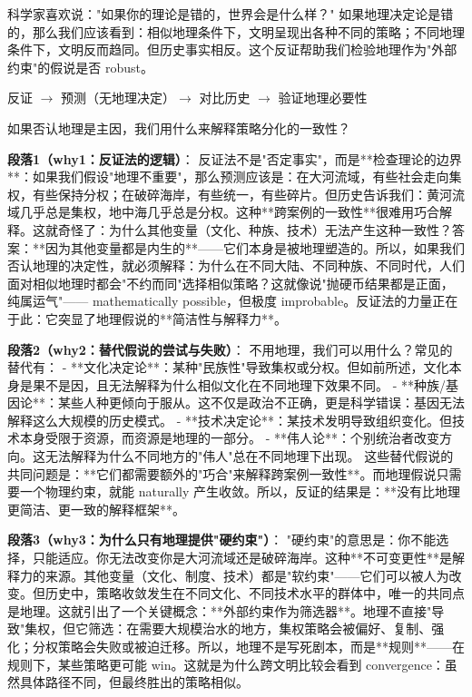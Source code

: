 \documentclass[openany, a4paper, 12pt]{book}
\newenvironment{logicmap}{
	\begin{tcolorbox}[
		colback=blue!5!white,      %
		colframe=blue!50!black,    %
		title=\textbf{逻辑地图 (Logic Map)}, %
		fonttitle=\bfseries,
		sharp corners=south,       %
		boxrule=0.5mm
		]
	\centering
	}{
	\end{tcolorbox}
}
\newenvironment{motivation}{
	\vspace{0.5em}
	\begin{tcolorbox}[
		colback=gray!10,           %
		colframe=gray!60,          %
		title=\textit{本章动机 (Motivation)},
		fonttitle=\bfseries,
		arc=0mm,                   %
		leftrule=3mm               %
		]
		\small \itshape %
	}{
	\end{tcolorbox}
	\vspace{1em}
}
\begin{document}
	\begin{motivation}
		科学家喜欢说："如果你的理论是错的，世界会是什么样？" 如果地理决定论是错的，那么我们应该看到：相似地理条件下，文明呈现出各种不同的策略；不同地理条件下，文明反而趋同。但历史事实相反。这个反证帮助我们检验地理作为"外部约束"的假说是否 robust。
	\end{motivation}
	
	\begin{logicmap}
		反证 $\rightarrow$ 预测（无地理决定）$\rightarrow$ 对比历史 $\rightarrow$ 验证地理必要性
	\end{logicmap}
	
	\begin{questionbox}
		如果否认地理是主因，我们用什么来解释策略分化的一致性？
	\end{questionbox}
	
	\textbf{段落1（why1：反证法的逻辑）}：  
	反证法不是"否定事实"，而是**检查理论的边界**：如果我们假设"地理不重要"，那么预测应该是：在大河流域，有些社会走向集权，有些保持分权；在破碎海岸，有些统一，有些碎片。但历史告诉我们：黄河流域几乎总是集权，地中海几乎总是分权。这种**跨案例的一致性**很难用巧合解释。这就奇怪了：为什么其他变量（文化、种族、技术）无法产生这种一致性？答案：**因为其他变量都是内生的**——它们本身是被地理塑造的。所以，如果我们否认地理的决定性，就必须解释：为什么在不同大陆、不同种族、不同时代，人们面对相似地理时都会"不约而同"选择相似策略？这就像说"抛硬币结果都是正面，纯属运气"—— mathematically possible，但极度 improbable。反证法的力量正在于此：它突显了地理假说的**简洁性与解释力**。
	
	\textbf{段落2（why2：替代假说的尝试与失败）}：  
	不用地理，我们可以用什么？常见的替代有：  
    - **文化决定论**：某种"民族性"导致集权或分权。但如前所述，文化本身是果不是因，且无法解释为什么相似文化在不同地理下效果不同。  
    - **种族/基因论**：某些人种更倾向于服从。这不仅是政治不正确，更是科学错误：基因无法解释这么大规模的历史模式。  
    - **技术决定论**：某技术发明导致组织变化。但技术本身受限于资源，而资源是地理的一部分。  
    - **伟人论**：个别统治者改变方向。这无法解释为什么不同地方的"伟人"总在不同地理下出现。  
    这些替代假说的共同问题是：**它们都需要额外的"巧合"来解释跨案例一致性**。而地理假说只需要一个物理约束，就能 naturally 产生收敛。所以，反证的结果是：**没有比地理更简洁、更一致的解释框架**。
	
	\textbf{段落3（why3：为什么只有地理提供"硬约束"）}：  
	"硬约束"的意思是：你不能选择，只能适应。你无法改变你是大河流域还是破碎海岸。这种**不可变更性**是解释力的来源。其他变量（文化、制度、技术）都是"软约束"——它们可以被人为改变。但历史中，策略收敛发生在不同文化、不同技术水平的群体中，唯一的共同点是地理。这就引出了一个关键概念：**外部约束作为筛选器**。地理不直接"导致"集权，但它筛选：在需要大规模治水的地方，集权策略会被偏好、复制、强化；分权策略会失败或被迫迁移。所以，地理不是写死剧本，而是**规则**——在规则下，某些策略更可能 win。这就是为什么跨文明比较会看到 convergence：虽然具体路径不同，但最终胜出的策略相似。
	
\end{document}
